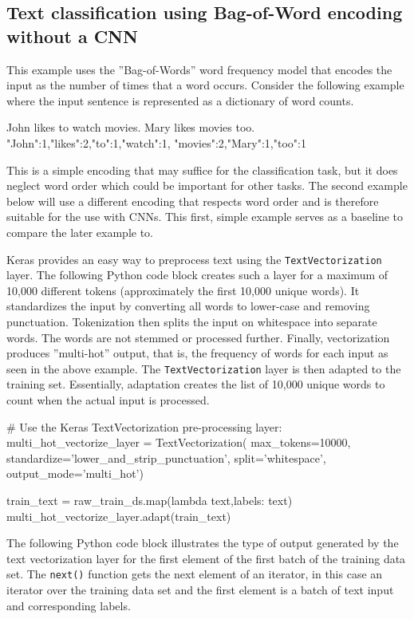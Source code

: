 \subsection[Bag-ofWord encoding]{Text classification using Bag-of-Word encoding without a CNN}

This example uses the ''Bag-of-Words''  word frequency model that encodes the input as the number of times that a word occurs. Consider the following example where the input sentence is represented as a dictionary of word counts. 

\begin{textcode}
John likes to watch movies. Mary likes movies too.
{"John":1,"likes":2,"to":1,"watch":1, "movies":2,"Mary":1,"too":1}
\end{textcode}

This is a simple encoding that may suffice for the classification task, but it does neglect word order which could be important for other tasks. The second example below will use a different encoding that respects word order and is therefore suitable for the use with CNNs. This first, simple example serves as a baseline to compare the later example to.

Keras provides an easy way to preprocess text using the \texttt{TextVectorization} layer. The following Python code block creates such a layer for a maximum of 10,000 different tokens (approximately the first 10,000 unique words). It standardizes the input by converting all words to lower-case and removing punctuation. Tokenization then splits the input on whitespace into separate words. The words are not stemmed or processed further. Finally, vectorization produces ''multi-hot'' output, that is, the frequency of words for each input as seen in the above example. The \texttt{TextVectorization} layer is then adapted to the training set. Essentially, adaptation creates the list of 10,000 unique words to count when the actual input is processed.

\begin{pythoncode}
# Use the Keras TextVectorization pre-processing layer:
multi_hot_vectorize_layer = TextVectorization(
    max_tokens=10000,
    standardize='lower_and_strip_punctuation',
    split='whitespace',
    output_mode='multi_hot')
    
train_text = raw_train_ds.map(lambda text,labels: text)
multi_hot_vectorize_layer.adapt(train_text)
\end{pythoncode}

The following Python code block illustrates the type of output generated by the text vectorization layer for the first element of the first batch of the training data set. The \texttt{next()} function gets the next element of an iterator, in this case an iterator over the training data set and the first element is a batch of text input and corresponding labels.

